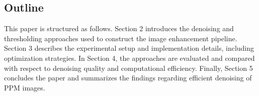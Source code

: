 \subsection{Outline}\label{subsec:outline}

This paper is structured as follows. 
Section 2 introduces the denoising and thresholding approaches used to construct the image enhancement pipeline. 
Section 3 describes the experimental setup and implementation details, including optimization strategies. 
In Section 4, the approaches are evaluated and compared with respect to denoising quality and computational efficiency. 
Finally, Section 5 concludes the paper and summarizes the findings regarding efficient denoising of PPM images.
